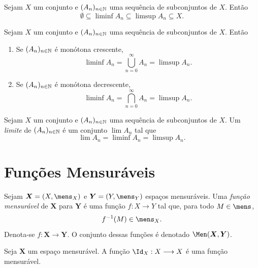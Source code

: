 \begin{prop}
	Sejam $X$ um conjunto e $(A_n)_{n \in \mathbb{N}}$ uma sequência de subconjuntos de $X$. Então
	\begin{equation*}
	\emptyset \subseteq \liminf A_n \subseteq \limsup A_n \subseteq X.
	\end{equation*}
\end{prop}

\begin{prop}
	Sejam $X$ um conjunto e $(A_n)_{n \in \mathbb{N}}$ uma sequência de subconjuntos de $X$. Então
	\begin{enumerate}
	\item Se $(A_n)_{n \in \mathbb{N}}$ é monótona crescente,
	\begin{equation*}
	\liminf A_n = \bigcup_{n=0}^\infty A_n = \limsup A_n.
	\end{equation*}
	
	\item Se $(A_n)_{n \in \mathbb{N}}$ é monótona decrescente,
	\begin{equation*}
	\liminf A_n = \bigcap_{n=0}^\infty A_n = \limsup A_n.
	\end{equation*}
	\end{enumerate}
\end{prop}

\begin{defi}
	Sejam $X$ um conjunto e $(A_n)_{n \in \mathbb{N}}$ uma sequência de subconjuntos de $X$. Um \emph{limite} de $(A_n)_{n \in \mathbb{N}}$ é um conjunto $\lim A_n$ tal que
	\begin{equation*}
	\lim A_n = \liminf A_n = \limsup A_n.
	\end{equation*}
\end{defi}


\section{Funções Mensuráveis}

\begin{defi}
Sejam $\bm X = (X,\mens_X)$ e $\bm Y = (Y,\mens_Y)$ espaços mensuráveis. Uma \emph{função mensurável} de $\bm X$ para $\bm Y$ é uma função $f\colon X \to Y$ tal que, para todo $M \in \mens$,
	\begin{equation*}
	f\inv(M) \in \mens_X.
	\end{equation*}
Denota-se $f\colon \bm X \to \bm Y$. O conjunto dessas funções é denotado $\Men(\bm X, \bm Y)$.
\end{defi}

\begin{prop}
Seja $\bm X$ um espaço mensurável. A função $\Id_X: X \to X$ é uma função mensurável.
\end{prop}

